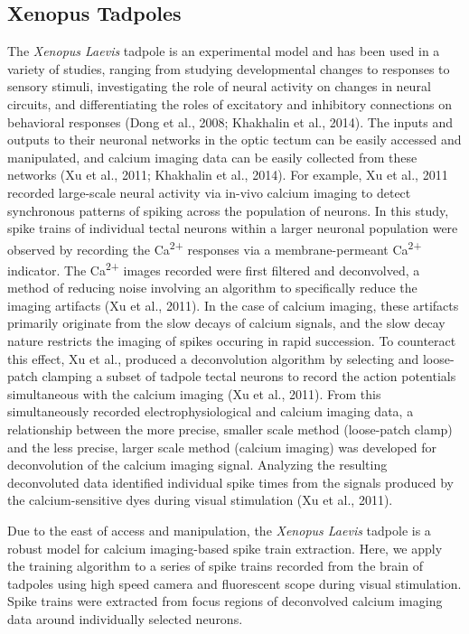 \documentclass[11pt]{article}
\begin{document}
\subsection{Xenopus Tadpoles}
The \textit{Xenopus Laevis} tadpole is an experimental model and has been used in a variety of studies, ranging from studying developmental changes to responses to sensory stimuli, investigating the role of neural activity on changes in neural circuits, and differentiating the roles of excitatory and inhibitory connections on behavioral responses (Dong et al., 2008; Khakhalin et al., 2014). The inputs and outputs to their neuronal networks in the optic tectum can be easily accessed and manipulated, and calcium imaging data can be easily collected from these networks (Xu et al., 2011; Khakhalin et al., 2014). For example, Xu et al., 2011 recorded large-scale neural activity via in-vivo calcium imaging to detect synchronous patterns of spiking across the population of neurons. In this study, spike trains of individual tectal neurons within a larger neuronal population were observed by recording the Ca\textsuperscript{2+} responses via a membrane-permeant Ca\textsuperscript{2+} indicator. The Ca\textsuperscript{2+} images recorded were first filtered and deconvolved, a method of reducing noise involving an algorithm to specifically reduce the imaging artifacts (Xu et al., 2011). In the case of calcium imaging, these artifacts primarily originate from the slow decays of calcium signals, and the slow decay nature restricts the imaging of spikes occuring in rapid succession. To counteract this effect, Xu et al., produced a deconvolution algorithm by selecting and loose-patch clamping a subset of tadpole tectal neurons to record the action potentials simultaneous with the calcium imaging (Xu et al., 2011). From this simultaneously recorded electrophysiological and calcium imaging data, a relationship between the more precise, smaller scale method (loose-patch clamp) and the less precise, larger scale method (calcium imaging) was developed for deconvolution of the calcium imaging signal. Analyzing the resulting deconvoluted data identified individual spike times from the signals produced by the calcium-sensitive dyes during visual stimulation (Xu et al., 2011).\par
Due to the east of access and manipulation, the \textit{Xenopus Laevis} tadpole is a robust model for calcium imaging-based spike train extraction. Here, we apply the training algorithm to a series of spike trains recorded from the brain of tadpoles using high speed camera and fluorescent scope during visual stimulation. Spike trains were extracted from focus regions of deconvolved calcium imaging data around individually selected neurons.
\end{document}

